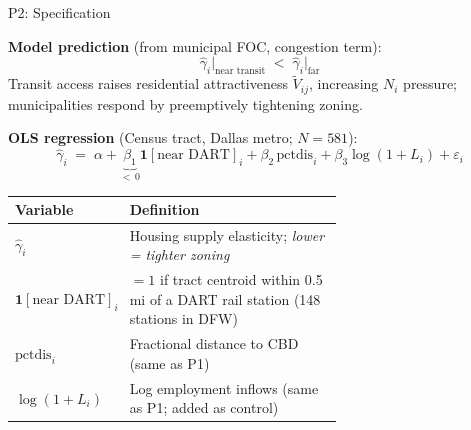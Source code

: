 \documentclass[10pt]{beamer}
\begin{document}
\begin{frame}{P2: Specification}

\textbf{Model prediction} (from municipal FOC, congestion term):
\[
  \hat\gamma_i\big|_{\text{near transit}} \;<\; \hat\gamma_i\big|_{\text{far}}
\]
Transit access raises residential attractiveness $\tilde V_{ij}$,
increasing $N_i$ pressure; municipalities respond by preemptively tightening zoning.

\bigskip
\textbf{OLS regression} \quad (Census tract, Dallas metro; $N = 581$):
\[
  \hat\gamma_i
  \;=\; \alpha
  + \underbrace{\beta_1}_{<\,0}\mathbf{1}[\text{near DART}]_i
  + \beta_2\,\text{pctdis}_i
  + \beta_3\log(1+L_i)
  + \varepsilon_i
\]

\bigskip
{\small
\renewcommand{\arraystretch}{1.3}
\begin{tabular}{@{}lp{0.65\linewidth}@{}}
\toprule
Variable & Definition \\
\midrule
$\hat\gamma_i$                    & Housing supply elasticity; \emph{lower = tighter zoning} \\[4pt]
$\mathbf{1}[\text{near DART}]_i$ & $=1$ if tract centroid within 0.5 mi of a DART rail station
                                    (148 stations in DFW) \\[4pt]
$\text{pctdis}_i$                 & Fractional distance to CBD (same as P1) \\[4pt]
$\log(1+L_i)$                     & Log employment inflows (same as P1; added as control) \\
\bottomrule
\end{tabular}
}

\end{frame}
\end{document}
